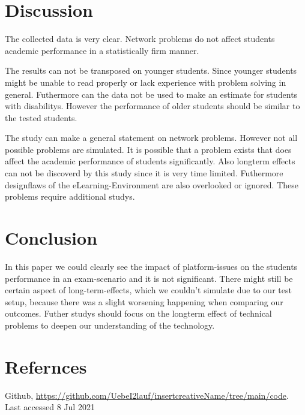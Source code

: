 \documentclass[runningheads]{llncs}
\begin{document}
\section{Discussion}
The collected data is very clear. Network problems do not affect students academic performance
in a statistically firm manner.

The results can not be transposed on younger students.
Since younger students might be unable to read properly or lack experience with problem solving
in general. Futhermore can the data not be used to make an estimate for students with disabilitys.
However the performance of older students should be similar to the tested students.

The study can make a general statement on network problems. However not all possible
problems are simulated. It is possible that a problem exists that does affect the academic performance of
students significantly. Also longterm effects can not be discoverd by this study since it is very time limited.
Futhermore designflaws of the eLearning-Environment are also overlooked or ignored.
These problems require additional studys.
\section{Conclusion}
In this paper we could clearly see the impact of platform-issues on the students performance in an 
exam-scenario and it is not significant. There might still be certain aspect of long-term-effects,
which we couldn't simulate due to our test setup, because there was a slight worsening happening 
when comparing our outcomes. Futher studys should focus on the longterm effect of technical problems
to deepen our understanding of the technology.
\section{Refernces}
\begin{thebibliography}{8}
    Github, \url{https://github.com/UebeI2lauf/insertcreativeName/tree/main/code}. Last accessed 8 Jul 2021
    \end{thebibliography}
\end{document}
